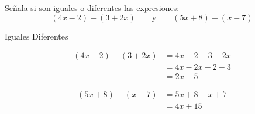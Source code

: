 



Señala si son iguales o diferentes las expresiones: \[(4x-2) - (3+2x)\qquad\text{y}\qquad(5x+8) - (x-7)\]
\begin{oneparchoices}
    \choice Iguales
    \CorrectChoice Diferentes
\end{oneparchoices}
\begin{solutionbox}{4cm}
    \begin{multicols}{2}
        \begin{align*}
            (4x-2) - (3+2x) & =4x-2-3-2x \\
                            & =4x-2x-2-3 \\
                            & =2x-5
        \end{align*}

        \columnbreak

        \begin{align*}
            (5x+8) - (x-7) & =5x+8-x+7 \\
                           & =4x+15
        \end{align*}
    \end{multicols}
\end{solutionbox}

